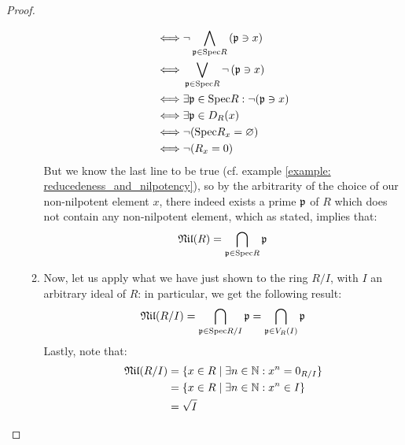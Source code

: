 \begin{proof}
\begin{enumerate}
\begin{enumerate}
$$\begin{aligned}
                                                    \iff & \neg \bigwedge_{\p \in \Spec R} \left(\p \ni x\right)
                                                    \\
                                                    \iff & \bigvee_{\p \in \Spec R} \neg \left(\p \ni x\right)
                                                    \\
                                                    \iff & \exists \p \in \Spec R: \neg(\p \ni x)
                                                    \\
                                                    \iff & \exists \p \in D_R(x)
                                                    \\
                                                    \iff & \neg(\Spec R_x = \varnothing)
                                                    \\
                                                    \iff & \neg(R_x = 0)
                                                \end{aligned}
                                            $$
                                        But we know the last line to be true (cf. example \ref{example: reducedeness_and_nilpotency}), so by the arbitrarity of the choice of our non-nilpotent element $x$, there indeed exists a prime $\p$ of $R$ which does not contain any non-nilpotent element, which as stated, implies that:
                                            $$\Nil(R) = \bigcap_{\p \in \Spec R} \p$$
                                        \item Now, let us apply what we have just shown to the ring $R/I$, with $I$ an arbitrary ideal of $R$: in particular, we get the following result:
                                            $$\Nil(R/I) = \bigcap_{\p \in \Spec R/I} \p = \bigcap_{\p \in V_R(I)} \p$$
                                        Lastly, note that:
                                            $$
                                                \begin{aligned}
                                                    \Nil(R/I) & = \{x \in R \mid \exists n \in \N: x^n = 0_{R/I}\}
                                                    \\
                                                    & = \{x \in R \mid \exists n \in \N: x^n \in I\}
                                                    \\
                                                    & = \sqrt{I}

\end{aligned}$$
\end{enumerate}
\end{enumerate}
\end{proof}

